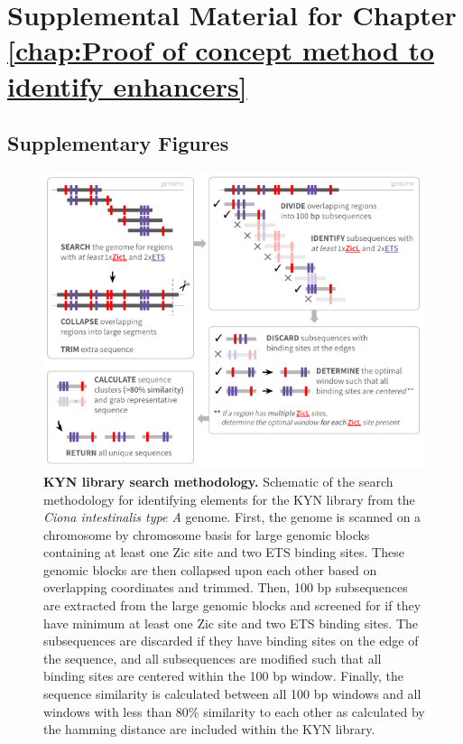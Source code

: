 \chapter{Supplemental Material for Chapter \ref{chap:Proof of concept method to identify enhancers}}

\section{Supplementary Figures}

\begin{figure}[h]
    \centering
    \includegraphics[scale=.5]{3_figures-and-files/FigS1_KYN-Search.png}
    \caption[KYN library search methodology]{\textbf{KYN library search methodology.} Schematic of the search methodology for identifying elements for the KYN library from the \textit{Ciona intestinalis type A} genome. First, the genome is scanned on a chromosome by chromosome basis for large genomic blocks containing at least one Zic site and two ETS binding sites. These genomic blocks are then collapsed upon each other based on overlapping coordinates and trimmed. Then, 100 bp subsequences are extracted from the large genomic blocks and screened for if they have minimum at least one Zic site and two ETS binding sites. The subsequences are discarded if they have binding sites on the edge of the sequence, and all subsequences are modified such that all binding sites are centered within the 100 bp window. Finally, the sequence similarity is calculated between all 100 bp windows and all windows with less than 80\% similarity to each other as calculated by the hamming distance are included within the KYN library.}
    \label{fig:supplement kyn library search}
\end{figure}